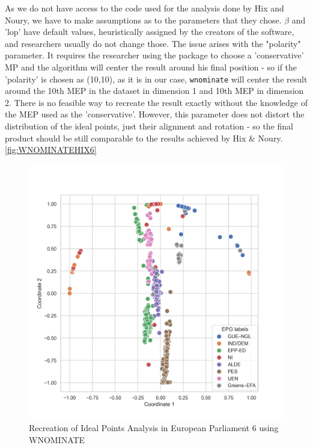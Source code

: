 \documentclass{report}
\begin{document}
                As we do not have access to the code used for the analysis done by Hix and Noury, we have to make
                assumptions as
                to the parameters that they chose. \( \beta \)
                        and 'lop' have default values, heuristically assigned by the
                        creators of the software, and researchers usually do not change those. The issue arises with the
                        "polarity"
                        parameter. It requires the researcher using the package to choose a 'conservative' MP and the
                        algorithm will
                        center the result around his final position - so if the 'polarity' is chosen as (10,10), as it
                        is in our case, \texttt{wnominate}
                will center the result around the 10th MEP in the dataset in dimension 1 and 10th MEP in dimension 2.
                There is
                no feasible way to recreate the result exactly without the knowledge of the MEP used as the
                'conservative'.
                However, this parameter does not distort the distribution of the ideal points, just their alignment and
                rotation
                - so the final product should be still comparable to the results achieved by Hix & Noury.
                        \ref{fig:WNOMINATEHIX6}

                \begin{figure}[H]
                    \centering
                    \includegraphics[width=1\textwidth]{Graphs/WNOMINATE2d.png}
                    \caption{Recreation of Ideal Points Analysis in European Parliament 6 using WNOMINATE}
                    \label{fig:WNOMINATE 6}
                \end{figure}
\end{document}
